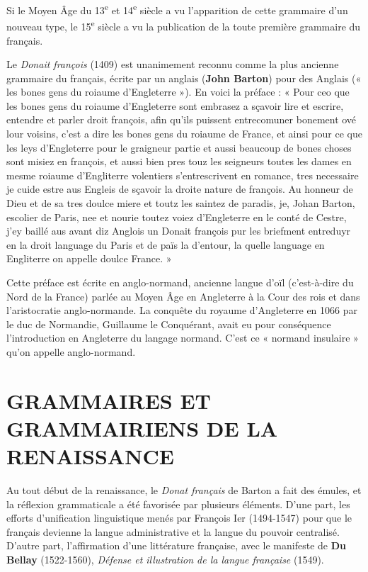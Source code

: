 Si le Moyen Âge du 13\textsuperscript{e} et 14\textsuperscript{e} siècle a vu l’apparition de cette grammaire d’un nouveau type, le 15\textsuperscript{e} siècle a vu la publication de la toute première grammaire du français.
\begin{bbcomplement}{}
Le \textit{Donait françois} (1409) est unanimement reconnu comme la plus ancienne grammaire du français, écrite par un anglais (\textbf{John Barton}) pour des Anglais (« les bones gens du roiaume d’Engleterre »). En voici la préface :
« Pour ceo que les bones gens du roiaume d’Engleterre sont embrasez a sçavoir lire et escrire, entendre et parler droit françois, afin qu’ils puissent entrecomuner bonement ové lour voisins, c’est a dire les bones gens du roiaume de France, et ainsi pour ce que les leys d’Engleterre pour le graigneur partie et aussi beaucoup de bones choses sont misiez en françois, et aussi bien pres touz les seigneurs toutes les dames en mesme roiaume d’Engliterre volentiers s’entrescrivent en romance, tres necessaire je cuide estre aus Engleis de sçavoir la droite nature de françois. Au honneur de Dieu et de sa tres doulce miere et toutz les saintez de paradis, je, Johan Barton, escolier de Paris, nee et nourie toutez voiez d’Engleterre en le conté de Cestre, j’ey baillé aus avant diz Anglois un Donait françois pur les briefment entreduyr en la droit language du Paris et de païs la d’entour, la quelle language en Engliterre on appelle doulce France. »

Cette préface est écrite en anglo-normand, ancienne langue d’oïl (c’est-à-dire du Nord de la France) parlée au Moyen Âge en Angleterre à la Cour des rois et dans l’aristocratie anglo-normande. La conquête du royaume d’Angleterre en 1066 par le duc de Normandie, Guillaume le Conquérant, avait eu pour conséquence l’introduction en Angleterre du langage normand. C’est ce « normand insulaire » qu’on appelle anglo-normand.
\end{bbcomplement}
\section{GRAMMAIRES ET GRAMMAIRIENS DE LA RENAISSANCE}
Au tout début de la renaissance, le \textit{Donat français} de Barton a fait des émules, et la réflexion grammaticale a été favorisée par plusieurs éléments. D’une part, les efforts d’unification linguistique menés par François Ier (1494-1547) pour que le français devienne la langue administrative et la langue du pouvoir centralisé. D’autre part, l’affirmation d’une littérature française, avec le manifeste de \textbf{Du Bellay} (1522-1560), \textit{Défense et illustration de la langue française} (1549).
